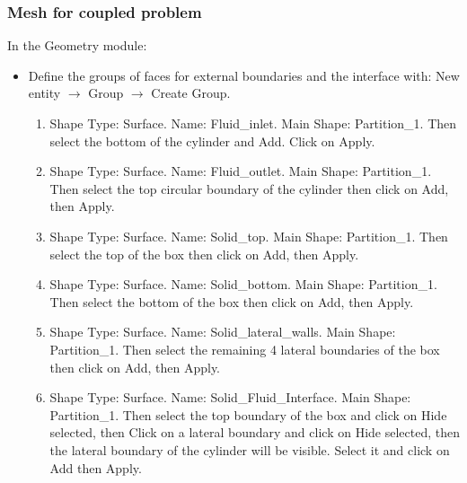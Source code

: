 \documentclass[10pt, hyperref={unicode=true,pdfusetitle, bookmarks=true,bookmarksnumbered=false,bookmarksopen=false, breaklinks=false,pdfborder={0 0l 1},backref=true,colorlinks=true,linkcolor=darkblue,pageanchor}]{beamer}
\begin{document}
\begin{frame}
\frametitle{Mesh for coupled problem}

\begin{block}{In the Geometry module:}
\begin{itemize}

 \item Define the groups of faces for external boundaries and the interface with: New entity $\rightarrow$ Group $\rightarrow$ Create Group.
 \begin{enumerate}
 \item Shape Type: Surface. Name: Fluid\_inlet. Main Shape: Partition\_1. Then select the bottom of the cylinder and Add. Click on Apply.
 \item Shape Type: Surface. Name: Fluid\_outlet. Main Shape: Partition\_1. Then select the top circular boundary of the cylinder then click on Add, then Apply.
 \item Shape Type: Surface. Name: Solid\_top. Main Shape: Partition\_1. Then select the top of the box then click on Add, then Apply.
 \item Shape Type: Surface. Name: Solid\_bottom. Main Shape: Partition\_1. Then select the bottom of the box then click on Add, then Apply.
 \item Shape Type: Surface. Name: Solid\_lateral\_walls. Main Shape: Partition\_1. Then select the remaining 4 lateral boundaries of the box then click on Add, then Apply.
 \item Shape Type: Surface. Name: Solid\_Fluid\_Interface. Main Shape: Partition\_1. Then select the top boundary of the box and click on Hide selected, then Click on a lateral boundary and click on Hide selected, then the lateral boundary of the cylinder will be visible. Select it and click on Add then Apply.
 \end{enumerate}
 
\end{itemize}
\end{block}

\end{frame}
\end{document}
